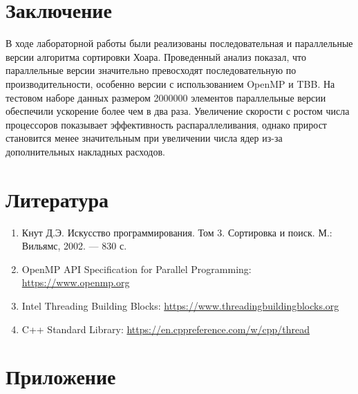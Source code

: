 \documentclass{report}
\begin{document}
\newpage

\section*{Заключение}
\par В ходе лабораторной работы были реализованы последовательная и параллельные версии алгоритма сортировки Хоара. Проведенный анализ показал, что параллельные версии значительно превосходят последовательную по производительности, особенно версии с использованием OpenMP и TBB. На тестовом наборе данных размером 2000000 элементов параллельные версии обеспечили ускорение более чем в два раза. Увеличение скорости с ростом числа процессоров показывает эффективность распараллеливания, однако прирост становится менее значительным при увеличении числа ядер из-за дополнительных накладных расходов.

\newpage

\section*{Литература}
\begin{enumerate}
    \item Кнут Д.Э. Искусство программирования. Том 3. Сортировка и поиск. М.: Вильямс, 2002. — 830 с.
    \item OpenMP API Specification for Parallel Programming: \url{https://www.openmp.org}
    \item Intel Threading Building Blocks: \url{https://www.threadingbuildingblocks.org}
    \item C++ Standard Library: \url{https://en.cppreference.com/w/cpp/thread}
\end{enumerate}

\newpage

\section*{Приложение}
\end{document}
